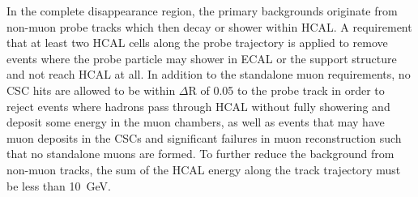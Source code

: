 In the complete disappearance region, the primary backgrounds originate from non-muon probe tracks which then decay or shower within HCAL. 
A requirement that at least two HCAL cells along the probe trajectory is applied to remove events where the probe particle may shower in ECAL or the support structure and not reach HCAL at all.
In addition to the standalone muon requirements, no CSC hits are allowed to be within $\Delta$R of 0.05 to the probe track in order to reject events where hadrons pass through HCAL without fully showering and deposit some energy in the muon chambers, as well as events that may have muon deposits in the CSCs and significant failures in muon reconstruction such that no standalone muons are formed.
To further reduce the background from non-muon tracks, the sum of the HCAL energy along the track trajectory must be less than \SI{10}{\giga\eV}. 

